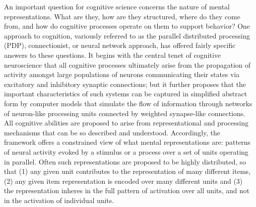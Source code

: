 An important question for cognitive science concerns the nature of mental representations. What are they, how are they structured, where do they come from, and how do cognitive processes operate on them to support behavior? One approach to cognition, variously referred to as the parallel distributed processing (PDP), connectionist, or neural network approach, has offered fairly specific answers to these questions\cite{McClellandRumelhart86}. It begins with the central tenet of cognitive neuroscience that all cognitive processes ultimately arise from the propagation of activity amongst large populations of neurons communicating their states via excitatory and inhibitory synaptic connections; but it further proposes that the important characteristics of such systems can be captured in simplified abstract form by computer models that simulate the flow of information through networks of neuron-like processing units connected by weighted synapse-like connections. All cognitive abilities are proposed to arise from representational and processing mechanisms that can be so described and understood. Accordingly, the framework offers a constrained view of what mental representations are: patterns of neural activity evoked by a stimulus or a process over a set of units operating in parallel. Often such representations are proposed to be highly distributed, so that (1) any given unit contributes to the representation of many different items, (2) any given item representation is encoded over many different units and (3) the representation inheres in the full pattern of activation over all units, and not in the activation of individual units.

